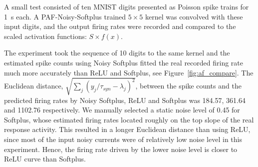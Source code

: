 \documentclass{article}
\begin{document}
	A small test consisted of ten MNIST digits presented as Poisson spike trains for 1~s each.
	A PAF-Noisy-Softplus trained $5\times5$ kernel was convolved with these input digits, and the output firing rates were recorded and compared to the scaled activation functions: $S \times f(x)$.
	
	The experiment took the sequence of 10 digits to the same kernel and the estimated spike counts using Noisy Softplus fitted the real recorded firing rate much more accurately than ReLU and Softplus, see Figure~\ref{fig:af_compare}.
	The Euclidean distance, $\sqrt{\sum_{j}(y_j/\tau_{syn} - \lambda_j)^2}$, between the spike counts and the predicted firing rates by Noisy Softplus, ReLU and Softplus was 184.57, 361.64 and 1102.76 respectively.
	We manually selected a static noise level of 0.45 for Softplus, whose estimated firing rates located roughly on the top slope of the real response activity.
	This resulted in a longer Euclidean distance than using ReLU, since most of the input noisy currents were of relatively low noise level in this experiment.
	Hence, the firing rate driven by the lower noise level is closer to ReLU curve than Softplus.
	
\end{document}
